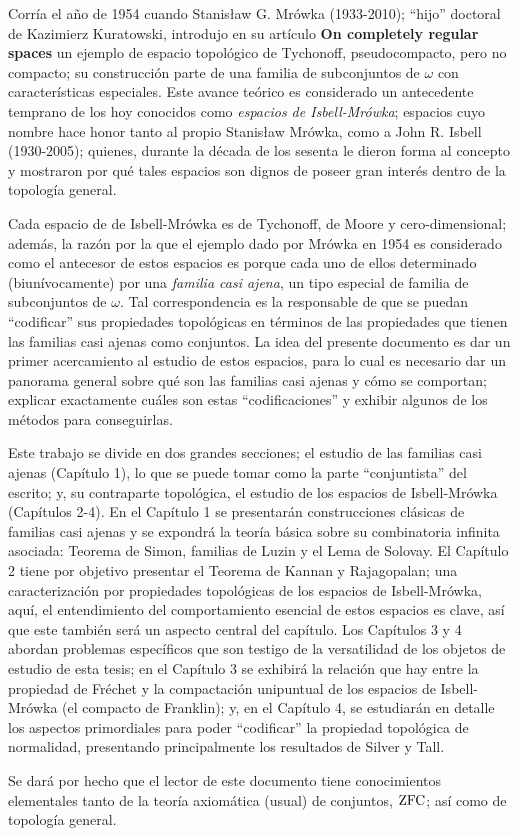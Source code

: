 Corría el año de 1954 cuando Stanisław G. Mrówka (1933-2010); ``hijo'' doctoral de Kazimierz Kuratowski, introdujo en su artículo \textbf{On completely regular spaces} un ejemplo de espacio topológico de Tychonoff, pseudocompacto, pero no compacto; su construcción parte de una familia de subconjuntos de $\omega$ con características especiales. Este avance teórico es considerado un antecedente temprano de los hoy conocidos como \textit{espacios de Isbell-Mrówka}; espacios cuyo nombre hace honor tanto al propio Stanisław Mrówka, como a John R. Isbell (1930-2005); quienes, durante la década de los sesenta le dieron forma al concepto y mostraron por qué tales espacios son dignos de poseer gran interés dentro de la topología general.

Cada espacio de de Isbell-Mrówka es de Tychonoff, de Moore y cero-dimensional; además, la razón por la que el ejemplo dado por Mrówka en 1954 es considerado como el antecesor de estos espacios es porque cada uno de ellos determinado (biunívocamente) por una \textit{familia casi ajena}, un tipo especial de familia de subconjuntos de $\omega$. Tal correspondencia es la responsable de que se puedan ``codificar'' sus propiedades topológicas en términos de las propiedades que tienen las familias casi ajenas como conjuntos. La idea del presente documento es dar un primer acercamiento al estudio de estos espacios, para lo cual es necesario dar un panorama general sobre qué son las familias casi ajenas y cómo se comportan; explicar exactamente cuáles son estas ``codificaciones'' y exhibir algunos de los métodos para conseguirlas.

Este trabajo se divide en dos grandes secciones; el estudio de las familias casi ajenas (Capítulo 1), lo que se puede tomar como la parte ``conjuntista'' del escrito; y, su contraparte topológica, el estudio de los espacios de Isbell-Mrówka (Capítulos 2-4). En el Capítulo 1 se presentarán construcciones clásicas de familias casi ajenas y se expondrá la teoría básica sobre su combinatoria infinita asociada: Teorema de Simon, familias de Luzin y el Lema de Solovay. El Capítulo 2 tiene por objetivo presentar el Teorema de Kannan y Rajagopalan; una caracterización por propiedades topológicas de los espacios de Isbell-Mrówka, aquí, el entendimiento del comportamiento esencial de estos espacios es clave, así que este también será un aspecto central del capítulo. Los Capítulos 3 y 4 abordan problemas específicos que son testigo de la versatilidad de los objetos de estudio de esta tesis; en el Capítulo 3 se exhibirá la relación que hay entre la propiedad de Fréchet y la compactación unipuntual de los espacios de Isbell-Mrówka (el compacto de Franklin); y, en el Capítulo 4, se estudiarán en detalle los aspectos primordiales para poder ``codificar'' la propiedad topológica de normalidad, presentando principalmente los resultados de Silver y Tall.

Se dará por hecho que el lector de este documento tiene conocimientos elementales tanto de la teoría axiomática (usual) de conjuntos, $\operatorname{ZFC}$; así como de topología general.

